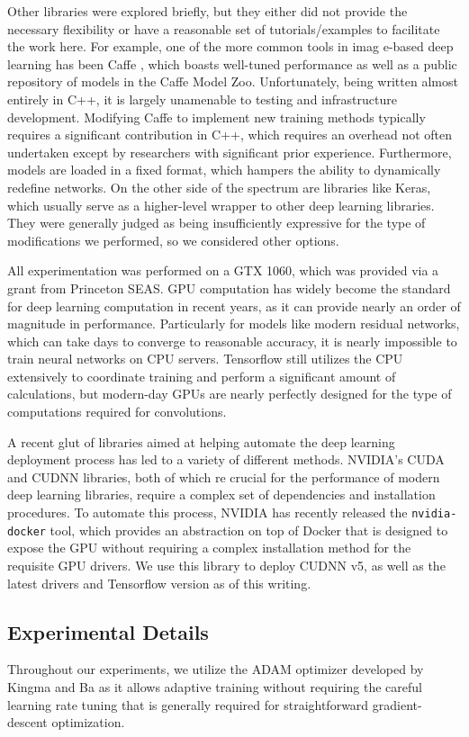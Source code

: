 Other libraries were explored briefly, but they either did not provide the necessary flexibility or have a reasonable set of tutorials/examples to facilitate the work here.
For example, one of the more common tools in imag e-based deep learning has been Caffe \cite{jia2014caffe}, which boasts well-tuned performance as well as a public repository of models in the Caffe Model Zoo.
Unfortunately, being written almost entirely in C++, it is largely unamenable to testing and infrastructure development.
Modifying Caffe to implement new training methods typically requires a significant contribution in C++, which requires an overhead not often undertaken except by researchers with significant prior experience.
Furthermore, models are loaded in a fixed format, which hampers the ability to dynamically redefine networks.
On the other side of the spectrum are libraries like Keras, which usually serve as a higher-level wrapper to other deep learning libraries.
They were generally judged as being insufficiently expressive for the type of modifications we performed, so we considered other options.

All experimentation was performed on a GTX 1060, which was provided via a grant from Princeton SEAS.
GPU computation has widely become the standard for deep learning computation in recent years, as it can provide nearly an order of magnitude in performance.
Particularly for models like modern residual networks, which can take days to converge to reasonable accuracy, it is nearly impossible to train neural networks on CPU servers.
Tensorflow still utilizes the CPU extensively to coordinate training and perform a significant amount of calculations, but modern-day GPUs are nearly perfectly designed for the type of computations required for convolutions.

A recent glut of libraries aimed at helping automate the deep learning deployment process has led to a variety of different methods.
NVIDIA's CUDA and CUDNN libraries, both of which re crucial for the performance of modern deep learning libraries, require a complex set of dependencies and installation procedures.
To automate this process, NVIDIA has recently released the \texttt{nvidia-docker} tool, which provides an abstraction on top of Docker that is designed to expose the GPU without requiring a complex installation method for the requisite GPU drivers.
We use this library to deploy CUDNN v5, as well as the latest drivers and Tensorflow version as of this writing.

\subsection{Experimental Details}
Throughout our experiments, we utilize the ADAM optimizer developed by Kingma and Ba \cite{kingma2014adam} as it allows adaptive training without requiring the careful learning rate tuning that is generally required for straightforward gradient-descent optimization.

